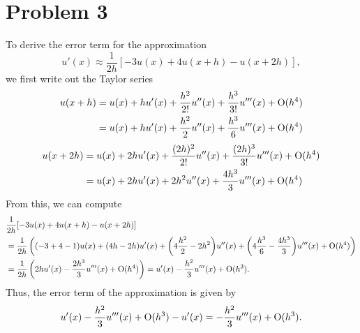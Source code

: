 \documentclass{article}
\begin{document}
\section{Problem 3}
To derive the error term for the approximation
\[
u' (x) \approx \frac{1}{2h} [ -3 u(x) + 4 u(x+h) - u(x+2h) ],
\]
we first write out the Taylor series
\begin{align*}
u(x+h)&=u(x)+hu'(x)+\frac{h^2}{2!}u''(x)+\frac{h^3}{3!}u'''(x)+\operatorname{O}(h^4)\\&=
u(x)+hu'(x)+\frac{h^2}{2}u''(x)+\frac{h^3}{6}u'''(x)+\operatorname{O}(h^4)
\end{align*}
\begin{align*}
u(x+2h)&=u(x)+2hu'(x)+\frac{(2h)^2}{2!}u''(x)+\frac{(2h)^3}{3!}u'''(x)+\operatorname{O}(h^4)\\&=u(x)+2hu'(x)+2h^2u''(x)+\frac{4h^3}{3}u'''(x)+\operatorname{O}(h^4) 
\end{align*}
From this, we can compute
\begin{align*}
&\frac{1}{2h} [ -3 u(x) + 4 u(x+h) - u(x+2h) ]\\&=\frac{1}{2h}\left((-3+4-1)u(x)+(4h-2h)u'(x)+\bigg(4\frac{h^2}{2}-2h^2\bigg)u''(x)+\bigg(4\frac{h^3}{6}-\frac{4h^3}{3}\bigg)u'''(x) +\operatorname{O}(h^4)\right)\\&=
\frac{1}{2h}\left(2hu'(x)-\frac{2h^3}{3}u'''(x)+\operatorname{O}(h^4)\right)=u'(x)-\frac{h^2}{3}u'''(x)+\operatorname{O}(h^3).
\end{align*}
Thus, the error term of the approximation is given by 
\[
u'(x)-\frac{h^2}{3}u'''(x)+\operatorname{O}(h^3)-u'(x)=-\frac{h^2}{3}u'''(x)+\operatorname{O}(h^3).
\]
\end{document}
